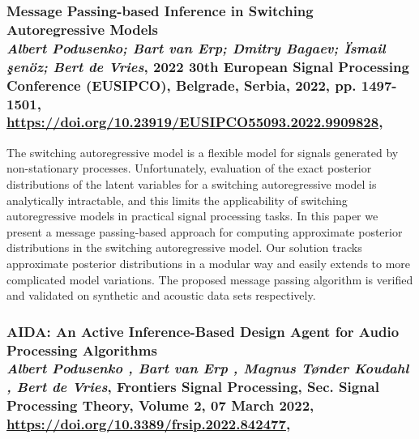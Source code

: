 \subsubsection*{Message Passing-based Inference in Switching Autoregressive Models\\{\small \normalfont \textit{Albert Podusenko; Bart van Erp; Dmitry Bagaev; Ïsmail şenöz; Bert de Vries}, 2022 30th European Signal Processing Conference (EUSIPCO), Belgrade, Serbia, 2022, pp. 1497-1501, \url{https://doi.org/10.23919/EUSIPCO55093.2022.9909828}, \citep{podusenko_message_2021-1}}}

The switching autoregressive model is a flexible model for signals generated by non-stationary
processes.
Unfortunately, evaluation of the exact posterior distributions of the latent variables for a
switching autoregressive model is analytically intractable, and this limits the applicability
of switching autoregressive models in practical signal processing tasks.
In this paper we present a message passing-based approach for computing approximate posterior
distributions in the switching autoregressive model.
Our solution tracks approximate posterior distributions in a modular way and easily extends to
more complicated model variations.
The proposed message passing algorithm is verified and validated on synthetic and acoustic
data sets respectively.

\subsubsection*{AIDA: An Active Inference-Based Design Agent for Audio Processing Algorithms\\{\small \normalfont \textit{Albert Podusenko , Bart van Erp , Magnus Tønder Koudahl , Bert de Vries}, Frontiers Signal Processing, Sec. Signal Processing Theory, Volume 2, 07 March 2022, \url{https://doi.org/10.3389/frsip.2022.842477}, \citep{podusenko_aida_2022}}}


